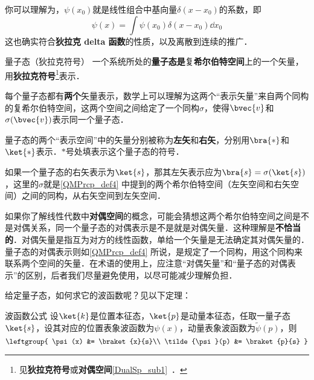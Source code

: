 你可以理解为，$\psi(x_0)$就是线性组合中基向量$\delta(x-x_0)$的系数，即
\begin{equation}\label{QMPrcp_eq7}
\psi(x) = \int \psi(x_0)\delta(x-x_0)\dd x_0
\end{equation}
这也确实符合\textbf{狄拉克 delta 函数}的性质，以及离散到连续的推广．





\begin{definition}{量子态（狄拉克符号）}\label{QMPrcp_def4}
一个系统所处的\textbf{量子态}\textbf{是}复\textbf{希尔伯特空间}上的一个矢量，用\textbf{狄拉克符号}\footnote{见\textbf{狄拉克符号}或\textbf{对偶空间}\autoref{DualSp_sub1}~．}表示．

每个量子态都有\textbf{两个}矢量表示，数学上可以理解为这两个“表示矢量”来自两个同构的复希尔伯特空间，这两个空间之间给定了一个同构$\sigma$，使得$\bvec{v}$和$\sigma(\bvec{v})$表示同一个量子态．

量子态的两个“表示空间”中的矢量分别被称为\textbf{左矢}和\textbf{右矢}，分别用$\bra{*}$和$\ket{*}$表示．$*$号处填表示这个量子态的符号．

\end{definition}



如果一个量子态的右矢表示为$\ket{s}$，那其左矢表示应为$\bra{s}=\sigma(\ket{s})$，这里的$\sigma$就是\autoref{QMPrcp_def4} 中提到的两个希尔伯特空间（左矢空间和右矢空间）之间的同构，从右矢空间到左矢空间．

如果你了解线性代数中\textbf{对偶空间}的概念，可能会猜想这两个希尔伯特空间之间是不是对偶关系，同一个量子态的对偶表示是不是就是对偶矢量．这种理解是\textbf{不恰当的}．对偶矢量是指互为对方的线性函数，单给一个矢量是无法确定其对偶矢量的．量子态的对偶表示则如\autoref{QMPrcp_def4} 所说，是规定了一个同构，用这个同构来联系两个空间的矢量．在术语的使用上，应注意“对偶矢量”和“量子态的对偶表示”的区别，后者我们尽量避免使用，以尽可能减少理解负担．


给定量子态，如何求它的波函数呢？见以下定理：

\begin{theorem}{波函数公式}
设$\ket{k}$是位置本征态，$\ket{p}$是动量本征态，任取一量子态$\ket{s}$，设其对应的位置表象波函数为$\psi(x)$，动量表象波函数为$\tilde{\psi}(p)$，则
\begin{equation}\label{QMPrcp_eq8}
\leftgroup{
    \psi(x) &= \braket{x}{s}\\
    \tilde{\psi}(p) &= \braket{p}{s}
}
\end{equation}
\end{theorem}

